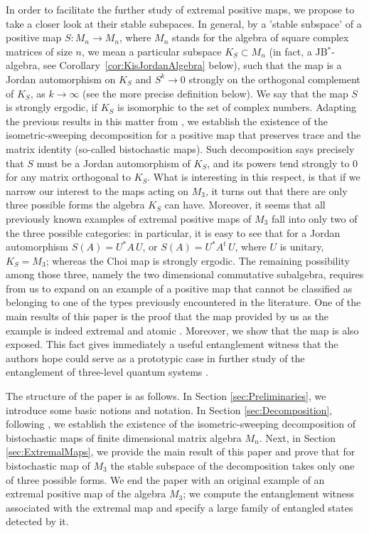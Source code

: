 \documentclass[12pt]{article}
\theoremstyle{plain}
\theoremstyle{definition}
\theoremstyle{remark}
\numberwithin{equation}{section}
\begin{document}
In order to facilitate the further study of extremal positive maps,
we propose to take a closer look at their stable subspaces.
In general, by a 'stable subspace' of a positive map 
$S \! : M_{n} \rightarrow M_{n}$,
where $M_{n}$ stands for the algebra of square complex matrices
of size $n$,
we mean a particular subspace $K_{S} \subset M_{n}$
(in fact, a JB$^{*}$-algebra, see 
\mbox{Corollary \ref{cor:KisJordanAlgebra}} 
below),
such that the map is a Jordan automorphism on $K_{S}$ and 
$S^{k} \rightarrow 0$ strongly
on the orthogonal complement of $K_{S}$,
as $k \rightarrow \infty$
(see the more precise definition below).
We say that the map $S$ is strongly ergodic,
if $K_{S}$ is isomorphic to the set of complex numbers.
Adapting the previous results in this matter from
\cite{olkiewicz1999environment},
we establish the existence of the isometric-sweeping
decomposition for a positive map that preserves trace and
the matrix identity
(so-called bistochastic maps).
Such decomposition says precisely that $S$ must be
a Jordan automorphism of $K_{S}$,
and its powers tend strongly to $0$ for any matrix orthogonal to $K_{S}$.
What is interesting in this respect,
is that if we narrow our interest to the maps acting on $M_{3}$,
it turns out that there are only three possible
forms the algebra $K_{S}$ can have.
Moreover, it seems that all previously known examples of extremal positive
maps of $M_{3}$ fall into only two of the three possible categories:
in particular,
it is easy to see that for a Jordan automorphism $S(A) = U^{*} A \, U$,
or $S(A) = U^{*} A^{t} \, U$,
where $U$ is unitary,
$K_{S} = M_{3}$;
whereas the Choi map
\cite{osaka1992class,choi1977extremal}
is strongly ergodic.
The remaining possibility among those three,
namely the two dimensional commutative subalgebra,
requires from us to expand on an example of a positive map
that cannot be classified as belonging to one of the types
previously encountered in the literature.
One of the main results of this paper is the proof
that the map provided by us as the example is indeed extremal and atomic
\cite{ha1998atomic}.
Moreover, we show that the map is also exposed.
This fact gives immediately a useful entanglement witness
that the authors hope could serve as a prototypic case in further study 
of the entanglement of three-level quantum systems
\cite{bertlmann2005optimal,caves2000qutrit}.

The structure of the paper is as follows.
In Section \ref{sec:Preliminaries},
we introduce some basic notions and notation.
In Section \ref{sec:Decomposition},
following \cite{olkiewicz1999environment},
we establish the existence of the isometric-sweeping
decomposition of bistochastic maps of finite dimensional
matrix algebra $M_{n}$.
Next, in Section \ref{sec:ExtremalMaps},
we provide the main result of this paper and prove that
for bistochastic map of $M_{3}$
the stable subspace of the decomposition takes only one of three
possible forms.
We end the paper with an original example of an extremal positive map of 
the algebra $M_{3}$;
we compute the entanglement witness associated with the extremal map
and specify a large family of entangled states detected by it.
\end{document}
